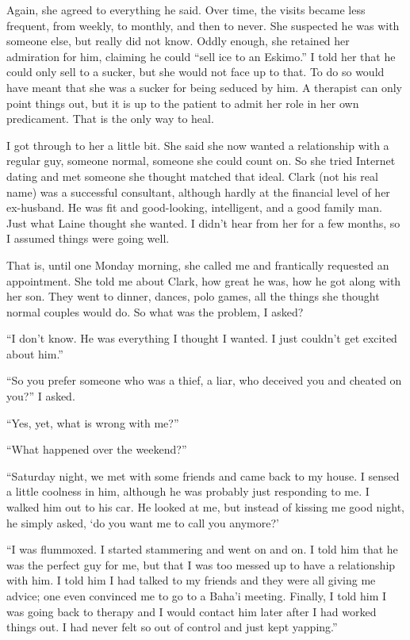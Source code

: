 Again, she agreed to everything he said. Over time, the visits became less frequent, from weekly, to monthly, and then to never. She suspected he was with someone else, but really did not know. Oddly enough, she retained her admiration for him, claiming he could ``sell ice to an Eskimo.'' I told her that he could only sell to a sucker, but she would not face up to that. To do so would have meant that she was a sucker for being seduced by him. A therapist can only point things out, but it is up to the patient to admit her role in her own predicament. That is the only way to heal.

I got through to her a little bit. She said she now wanted a relationship with a regular guy, someone normal, someone she could count on. So she tried Internet dating and met someone she thought matched that ideal. Clark (not his real name) was a successful consultant, although hardly at the financial level of her ex-husband. He was fit and good-looking, intelligent, and a good family man. Just what Laine thought she wanted. I didn't hear from her for a few months, so I assumed things were going well.

That is, until one Monday morning, she called me and frantically requested an appointment. She told me about Clark, how great he was, how he got along with her son. They went to dinner, dances, polo games, all the things she thought normal couples would do. So what was the problem, I asked?

``I don't know. He was everything I thought I wanted. I just couldn't get excited about him.''

``So you prefer someone who was a thief, a liar, who deceived you and cheated on you?'' I asked.

``Yes, yet, what is wrong with me?''

``What happened over the weekend?''

``Saturday night, we met with some friends and came back to my house. I sensed a little coolness in him, although he was probably just responding to me. I walked him out to his car. He looked at me, but instead of kissing me good night, he simply asked, `do you want me to call you anymore?'

``I was flummoxed. I started stammering and went on and on. I told him that he was the perfect guy for me, but that I was too messed up to have a relationship with him. I told him I had talked to my friends and they were all giving me advice; one even convinced me to go to a Baha'i meeting. Finally, I told him I was going back to therapy and I would contact him later after I had worked things out. I had never felt so out of control and just kept yapping.''


